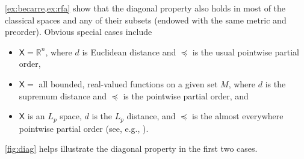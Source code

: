 \documentclass[12pt,reqno]{amsart}
\numberwithin{equation}{section}
\theoremstyle{definition}
\newcommand{\1}{\mathbbm{1}}
\newcommand{\RR}{\mathbb{R}}
\newcommand{\Xsf}{\mathsf{X}}
\begin{document}
\cref{ex:becarre,ex:rfa} show that the diagonal property also holds in most of the
classical spaces and any of their subsets (endowed with the same metric and
preorder).  Obvious special cases include
%
\begin{itemize}
    \item $\Xsf = \RR^n$, where $d$ is Euclidean distance and $\preceq$
        is the usual pointwise partial order,
    \item $\Xsf =$ all bounded, real-valued functions on a given set $M$,
        where $d$ is the supremum distance and $\preceq$ is the pointwise partial order, and
    \item $\Xsf$ is an $L_p$ space, $d$ is the $L_p$ distance, 
        and $\preceq$ is the almost everywhere pointwise partial order (see,
        e.g., \cite{zaanen2012introduction}).
\end{itemize}
%
\cref{fig:diag} helps illustrate the diagonal property in the first two cases.
\end{document}
